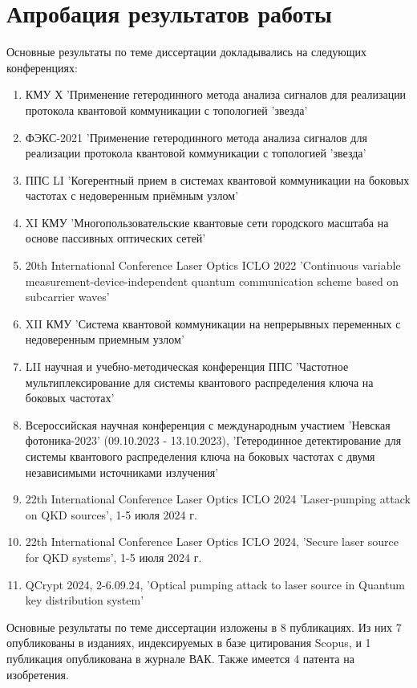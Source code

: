 \section*{Апробация результатов работы}
Основные результаты по теме диссертации докладывались на следующих конференциях:
\begin{enumerate}
    \item КМУ Х 'Применение гетеродинного метода анализа сигналов для реализации протокола квантовой коммуникации с топологией 'звезда'
    \item ФЭКС-2021 'Применение гетеродинного метода анализа сигналов для реализации протокола квантовой коммуникации с топологией 'звезда'
    \item ППС LI 'Когерентный прием в системах квантовой коммуникации на боковых частотах с недоверенным приёмным узлом'
    \item XI КМУ 'Многопользовательские квантовые сети городского масштаба на основе пассивных оптических сетей'
    \item 20th International Conference Laser Optics ICLO 2022 'Continuous variable measurement-device-independent quantum communication scheme based on subcarrier waves'
    \item XII КМУ 'Система квантовой коммуникации на непрерывных переменных с недоверенным приемным узлом'
    \item LII научная и учебно-методическая конференция ППС 'Частотное мультиплексирование для системы квантового распределения ключа на боковых частотах'
    \item Всероссийская научная конференция с международным участием 'Невская фотоника-2023' (09.10.2023 - 13.10.2023), 'Гетеродинное детектирование для системы квантового распределения ключа на боковых частотах с двумя независимыми источниками излучения'
    \item 22th International Conference Laser Optics ICLO 2024 'Laser-pumping attack on QKD sources', 1-5 июля 2024 г.
    \item 22th International Conference Laser Optics ICLO 2024, 'Secure laser source for QKD systems', 1-5 июля 2024 г.
    \item QCrypt 2024, 2-6.09.24, 'Optical pumping attack to laser source in Quantum key distribution system'
\end{enumerate}
Основные результаты по теме диссертации изложены в 8 публикациях. Из них 7 опубликованы в изданиях, индексируемых в базе цитирования Scopus, и 1 публикация опубликована в журнале ВАК. Также имеется 4 патента на изобретения.\\



